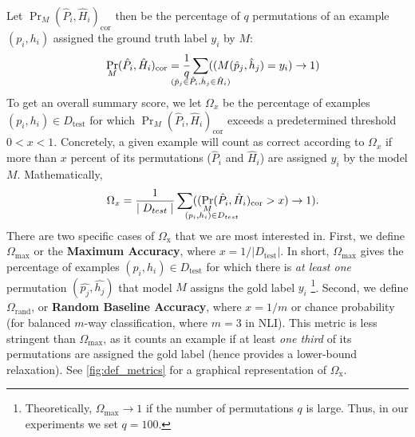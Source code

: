 \documentclass[11pt,a4paper]{article}
\begin{document}
Let $\Pr_{M}(\hat{P}_i, \hat{H}_i)_{\text{cor}}$ then be the percentage of $q$ permutations of an example $(p_i, h_i)$ assigned the ground truth label $y_i$ by $M$: 
    \begin{align}
    &&\Pr_{M}(\hat{P}_i, \hat{H}_i)_{\text{cor}} =  
    \frac{1}{q}\sum_{\mathclap{(\hat{p}_j \in \hat{P}_i, \hat{h}_j \in \hat{H}_i)}}((M(\hat{p}_j, \hat{h}_j) = y_i) \rightarrow 1)
    \end{align}
To get an overall summary score, we let $\Omega_x$ be the percentage of examples $(p_i, h_i) \in D_{\text{test}}$ for which $\Pr_{M}(\hat{P}_i, \hat{H}_i)_{\text{cor}}$ exceeds a predetermined threshold $0 < x < 1$. %
Concretely, a given example will count as correct according to $\Omega_x$ if more than $x$ percent of its permutations ($\hat{P}_i$ and $\hat{H}_i$) are assigned $y_i$ by the model $M$.
Mathematically, 
    \begin{align} %
    &&\Omega_x = \frac{1}{\mid D_{test}\mid} \sum_{\mathrlap{(p_i, h_i)\in D_{test}}} ((\Pr_{M}(\hat{P}_i, \hat{H}_i)_{\text{cor}} 
    > x) \rightarrow 1).
    \end{align}
There are two specific cases of $\Omega_{\text{x}}$ that we are most interested in. First, we define $\Omega_{\text{max}}$ or the \textbf{Maximum Accuracy}, where $x = 1 / |D_{\text{test}}|$. In short, $\Omega_{\text{max}}$ gives the percentage of examples $(p_i, h_i) \in D_{\text{test}}$ for which there is \textit{at least one} permutation $(\hat{p_j}, \hat{h_j})$ that model $M$ assigns the gold label $y_i$
\footnote{Theoretically, $\Omega_{\text{max}} \rightarrow 1$ if the number of permutations $q$ is large. Thus, in our experiments we set $q=100$.}.
Second, we define $\Omega_{\text{rand}}$, or \textbf{Random Baseline Accuracy}, where $x = 1 / m$ or chance probability (for balanced $m$-way classification, where $m=3$ in NLI). This metric is less stringent than $\Omega_{\text{max}}$, as it counts an example if at least \textit{one third} of its permutations are assigned the gold label (hence provides a lower-bound relaxation). See \autoref{fig:def_metrics} for a graphical representation of $\Omega_{\text{x}}$.
\end{document}
